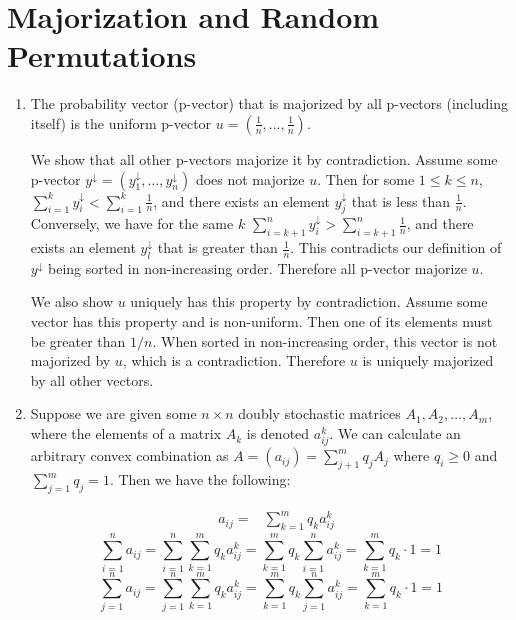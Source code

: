 \documentclass[12pt]{article}
\begin{document}
\newcommand{\ket}[1]{|#1 \rangle}
\newcommand{\normtwo}{\frac{1}{\sqrt{2}}}

\setcounter{section}{0}
\section{Majorization and Random Permutations}

\begin{enumerate}

\item
The probability vector (p-vector) that is majorized by all p-vectors
(including itself)
is the uniform p-vector $u = (\frac{1}{n},\ldots ,\frac{1}{n})$.

We show that all other p-vectors majorize it by contradiction. Assume some
p-vector $y^\downarrow = (y_1^\downarrow,\ldots ,y_n^\downarrow)$ does not
majorize $u$. Then for some
$1 \le k \le n$, $\sum_{i=1}^k y_i^\downarrow < \sum_{i=1}^k \frac{1}{n}$,
and there exists an element $y_j^\downarrow$ that is less than $\frac{1}{n}$.
Conversely, we have for the same $k$
$\sum_{i=k+1}^n y_i^\downarrow > \sum_{i=k+1}^n \frac{1}{n}$,
and there exists an element $y_l^\downarrow$ that is greater
than $\frac{1}{n}$. This contradicts our definition of $y^\downarrow$ being
sorted in non-increasing order. Therefore all p-vector majorize $u$.

We also show $u$ uniquely has this property by contradiction.
Assume some vector has this property and is non-uniform.
Then one of its elements
must be greater than $1/n$. When sorted in non-increasing order, this
vector is not majorized by $u$, which is a contradiction.
Therefore $u$ is uniquely majorized by all other vectors.

\item
Suppose we are given some $n\times n$
doubly stochastic matrices $A_1,A_2,\ldots ,A_m$,
where the elements of a matrix $A_k$ is denoted $a^k_{ij}$.
We can
calculate an arbitrary convex combination as
$A = (a_{ij}) = \sum_{j+1}^m q_jA_j$
where $q_i \ge 0$ and $\sum_{j=1}^m q_j = 1$. Then we have the following:

\begin{eqnarray*}
& a_{ij} = & \sum_{k=1}^m q_k a^k_{ij}
\end{eqnarray*}
\begin{displaymath}
\sum_{i = 1}^n a_{ij} = \sum_{i=1}^n \sum_{k=1}^m q_k a^k_{ij}
                       =  \sum_{k=1}^m q_k \sum_{i=1}^n a^k_{ij}
                       =  \sum_{k=1}^m q_k \cdot 1
                       =  1
\end{displaymath}
\begin{displaymath}
\sum_{j = 1}^n a_{ij} =  \sum_{j=1}^n \sum_{k=1}^m q_k a^k_{ij}
                       =  \sum_{k=1}^m q_k \sum_{j=1}^n a^k_{ij}
                       =  \sum_{k=1}^m q_k \cdot 1
                       =  1
\end{displaymath}


\end{enumerate}
\end{document}
